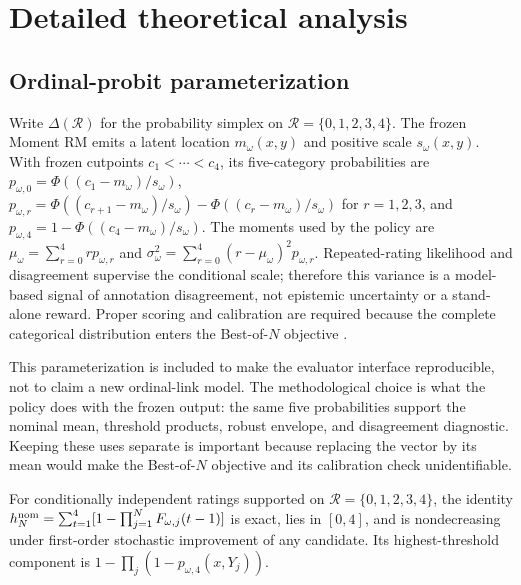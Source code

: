 
\section{Detailed theoretical analysis}
\label{app:theory}

\subsection{Ordinal-probit parameterization}
\label{app:ordinal-probit}
Write \(\Delta(\mathcal R)\) for the probability simplex on
\(\mathcal R=\{0,1,2,3,4\}\).
The frozen Moment RM emits a latent location $m_\omega(x,y)$ and positive
scale $s_\omega(x,y)$.  With frozen cutpoints
$c_1<\cdots<c_4$, its five-category probabilities are
\(p_{\omega,0}=\Phi((c_1-m_\omega)/s_\omega)\),
\(p_{\omega,r}=\Phi((c_{r+1}-m_\omega)/s_\omega)-
\Phi((c_r-m_\omega)/s_\omega)\) for $r=1,2,3$, and
\(p_{\omega,4}=1-\Phi((c_4-m_\omega)/s_\omega)\).  The moments used by
the policy are \(\mu_\omega=\sum_{r=0}^4rp_{\omega,r}\) and
\(\sigma_\omega^2=\sum_{r=0}^4(r-\mu_\omega)^2p_{\omega,r}\).
Repeated-rating likelihood and disagreement supervise the conditional scale;
therefore this variance is a model-based signal of annotation disagreement,
not epistemic uncertainty or a stand-alone reward.  Proper scoring and
calibration are required because the complete categorical distribution enters
the Best-of-\(N\) objective \citep{mccullagh1980regression,kendall2017uncertainties,
lou2024uncertainty,sun2025purm,gneiting2007strictly,guo2017calibration}.

This parameterization is included to make the evaluator interface reproducible,
not to claim a new ordinal-link model.  The methodological choice is what the
policy does with the frozen output: the same five probabilities support the
nominal mean, threshold products, robust envelope, and disagreement diagnostic.
Keeping these uses separate is important because replacing the vector by its
mean would make the Best-of-\(N\) objective and its calibration check
unidentifiable.

\begin{proposition}
\label{prop:threshold-decomposition}
For conditionally independent ratings supported on
\(\mathcal R=\{0,1,2,3,4\}\),
the identity
\(h_N^{\rm nom}=\sum_{t=1}^{4}[1-\prod_{j=1}^{N}F_{\omega,j}(t-1)]\)
is exact, lies in \([0,4]\), and is nondecreasing under first-order stochastic
improvement of any candidate.  Its highest-threshold component is
\(1-\prod_j(1-p_{\omega,4}(x,Y_j))\).
\end{proposition}

